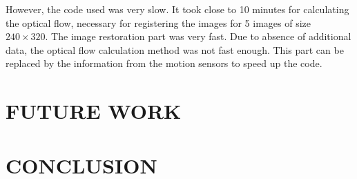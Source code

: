 \documentclass[BTech]{iitmdiss}
\begin{document}
However,
the code used was very slow. It took close to 10 minutes for calculating
the optical flow, necessary for registering the images for 5 images of 
size $240\times320$. The image restoration part was very fast. Due to
absence of additional data, the optical flow calculation method was not
fast enough. This part can be replaced by the information from the motion
sensors to speed up the code. 
\pagebreak

\chapter{FUTURE WORK}
\label{chap:future_work}

\pagebreak

\chapter{CONCLUSION}
\label{chap:conclusion}

\pagebreak
\end{document}
